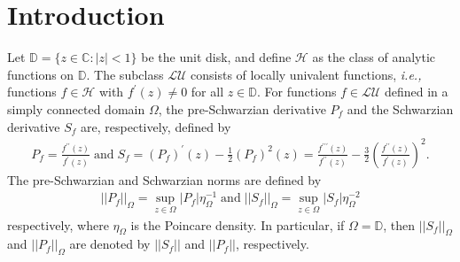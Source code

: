 \documentclass[a4paper,12pt]{amsart}
\theoremstyle{plain}
\theoremstyle{definition}
\theoremstyle{plain}
\begin{document}
\section{\bf Introduction}
Let \( \mathbb{D} = \{z \in \mathbb{C} : |z| < 1\} \) be the unit disk, and define \( \mathcal{H} \) as the class of analytic functions on \( \mathbb{D} \). The subclass \( \mathcal{LU} \) consists of locally univalent functions, \textit{i.e.,} functions \( f \in \mathcal{H} \) with \( f^{\prime}(z) \neq 0 \) for all \( z \in \mathbb{D} \). For functions $f\in\mathcal{LU}$ defined in a simply connected domain ${\Omega}$, the pre-Schwarzian derivative $P_f$ and the Schwarzian derivative $S_f$ are, respectively, defined by
\begin{align*}
	P_f=\frac{f^{\prime\prime}(z)}{f^{\prime}(z)}\;\mbox{and}\;S_f=(P_f)^{\prime}(z)-\frac{1}{2}(P_f)^2(z)=\frac{f^{\prime\prime\prime}(z)}{f^{\prime\prime}(z)}-\frac{3}{2}\left(\frac{f^{\prime\prime}(z)}{f^{\prime}(z)}\right)^2.
\end{align*}
The pre-Schwarzian and Schwarzian norms are defined by
\begin{align*}
	||P_f||_{\Omega}= \sup_{z\in{\Omega}}|P_f|\eta^{-1}_{\Omega}\;\mbox{and}\;||S_f||_{\Omega}= \sup_{z\in{\Omega}}|S_f|\eta^{-2}_{\Omega}
\end{align*}
respectively, where $\eta_{\Omega}$ is the Poincare density. In particular, if ${\Omega}=\mathbb{D}$, then $||S_f||_{\Omega}$ and $||P_f||_{\Omega}$ are denoted by $||S_f||$ and $||P_f||$,  respectively.\vspace{2mm}
\end{document}
